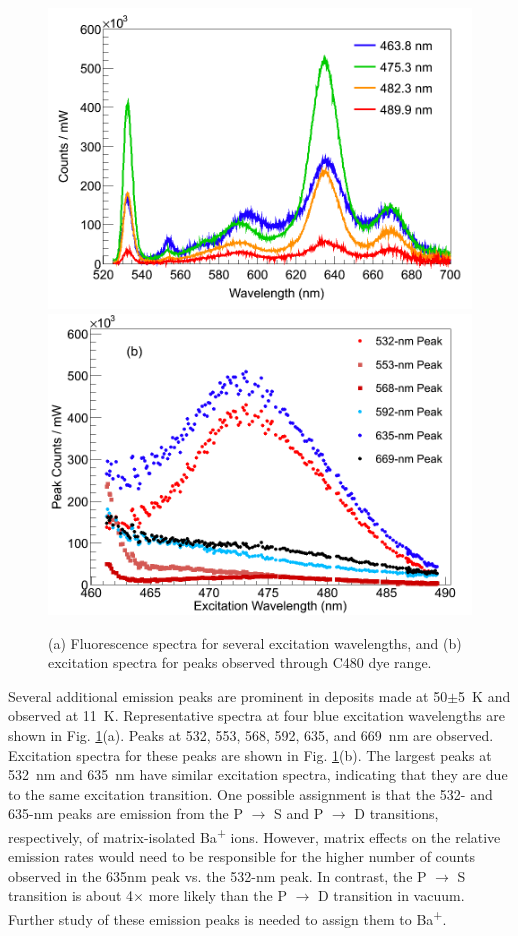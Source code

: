 \begin{figure} %
        \centering
                \includegraphics[width=.7\textwidth]{figures/excitspec_blu_a.png}
                \includegraphics[width=.7\textwidth]{figures/excitspecBlue_b.png}
                \caption{(a) Fluorescence spectra for several excitation wavelengths, and (b) excitation spectra for peaks observed through C480 dye range. \cite{Mong2015}}
\label{fig:excitspecBlue}
\end{figure}

Several additional emission peaks are prominent in deposits made at 50$\pm$5~K and observed at 11~K.  Representative spectra at four blue excitation wavelengths are shown in Fig. \ref{fig:excitspecBlue}(a).  Peaks at 532, 553, 568, 592, 635, and 669~nm are observed.  Excitation spectra for these peaks are shown in Fig. \ref{fig:excitspecBlue}(b).  The largest peaks at 532~nm and 635~nm have similar excitation spectra, indicating that they are due to the same excitation transition.  One possible assignment is that the 532- and 635-nm peaks are emission from the P $\rightarrow$ S and P $\rightarrow$ D transitions, respectively, of matrix-isolated Ba\textsuperscript{+} ions.  However, matrix effects on the relative emission rates would need to be responsible for the higher number of counts observed in the 635nm peak vs. the 532-nm peak.  In contrast, the P $\rightarrow$ S transition is about 4$\times$ more likely than the P $\rightarrow$ D transition in vacuum.  Further study of these emission peaks is needed to assign them to Ba\textsuperscript{+}.



